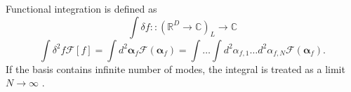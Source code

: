 Functional integration is defined as
\[
	\int \delta f ::
	(\mathbb{R}^D \rightarrow \mathbb{C})_L	\rightarrow \mathbb{C}
\]
\[
	\int \delta^2 f \mathcal{F}[f]
	= \int d^2\bm{\alpha}_f \mathcal{F}(\bm{\alpha}_f)
	= \int \ldots \int d^2\alpha_{f,1} \ldots d^2\alpha_{f,N} \mathcal{F}(\bm{\alpha}_f).
\]
If the basis contains infinite number of modes, the integral is treated as a limit $N \rightarrow \infty$ .

